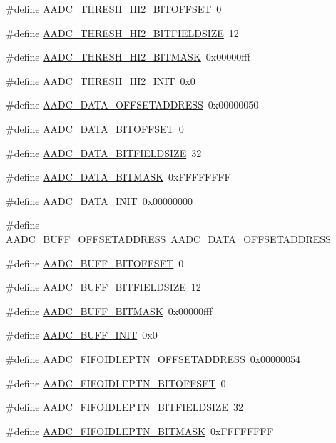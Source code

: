 \begin{DoxyCompactItemize}
\item 
\#define \hyperlink{a00543_a4f3b4bc67511e5962e4c3003feb45eca}{AADC\_\-THRESH\_\-HI2\_\-BITOFFSET}~0
\item 
\#define \hyperlink{a00543_a7310d3eec3fbad187c7687a4f3f77867}{AADC\_\-THRESH\_\-HI2\_\-BITFIELDSIZE}~12
\item 
\#define \hyperlink{a00543_abdeea73a4f5f9cfeb20e85fdb3872bb7}{AADC\_\-THRESH\_\-HI2\_\-BITMASK}~0x00000fff
\item 
\#define \hyperlink{a00543_abd6ee29fd44dba092da5c5406309dbcc}{AADC\_\-THRESH\_\-HI2\_\-INIT}~0x0
\item 
\#define \hyperlink{a00543_aa271f1ad94e358cb32da98eef3821e78}{AADC\_\-DATA\_\-OFFSETADDRESS}~0x00000050
\item 
\#define \hyperlink{a00543_ad019e431ecf1252f53e2e6cb9f56fed3}{AADC\_\-DATA\_\-BITOFFSET}~0
\item 
\#define \hyperlink{a00543_a30e6864c56131fa5be89835ec3ad3a8f}{AADC\_\-DATA\_\-BITFIELDSIZE}~32
\item 
\#define \hyperlink{a00543_a1758e1ae09e21e588b7f4d5c590ed71d}{AADC\_\-DATA\_\-BITMASK}~0xFFFFFFFF
\item 
\#define \hyperlink{a00543_abf2829aaf0d69c9d84059d73e5db9150}{AADC\_\-DATA\_\-INIT}~0x00000000
\item 
\#define \hyperlink{a00543_af5d2a78674198148bbe174c241345bb2}{AADC\_\-BUFF\_\-OFFSETADDRESS}~AADC\_\-DATA\_\-OFFSETADDRESS
\item 
\#define \hyperlink{a00543_a3265997496e1cee7dcc0ab06218dfc1a}{AADC\_\-BUFF\_\-BITOFFSET}~0
\item 
\#define \hyperlink{a00543_ac1e0837a5bdee400224451045d3e1c3a}{AADC\_\-BUFF\_\-BITFIELDSIZE}~12
\item 
\#define \hyperlink{a00543_a3971c4512feed41eb6cdda2773331dbd}{AADC\_\-BUFF\_\-BITMASK}~0x00000fff
\item 
\#define \hyperlink{a00543_af3e823bcb52c40b3f7974cb0bf421779}{AADC\_\-BUFF\_\-INIT}~0x0
\item 
\#define \hyperlink{a00543_a9eea3a25eedc73ba5ce32ee2da0a3f4d}{AADC\_\-FIFOIDLEPTN\_\-OFFSETADDRESS}~0x00000054
\item 
\#define \hyperlink{a00543_a59f60d4d15aaa0ee311b6aae78649ed7}{AADC\_\-FIFOIDLEPTN\_\-BITOFFSET}~0
\item 
\#define \hyperlink{a00543_a6a6580735ced9d7dfbd8850a6106f7af}{AADC\_\-FIFOIDLEPTN\_\-BITFIELDSIZE}~32
\item 
\#define \hyperlink{a00543_a61aceacf5f82d198a396848cccd80837}{AADC\_\-FIFOIDLEPTN\_\-BITMASK}~0xFFFFFFFF

\end{DoxyCompactItemize}
